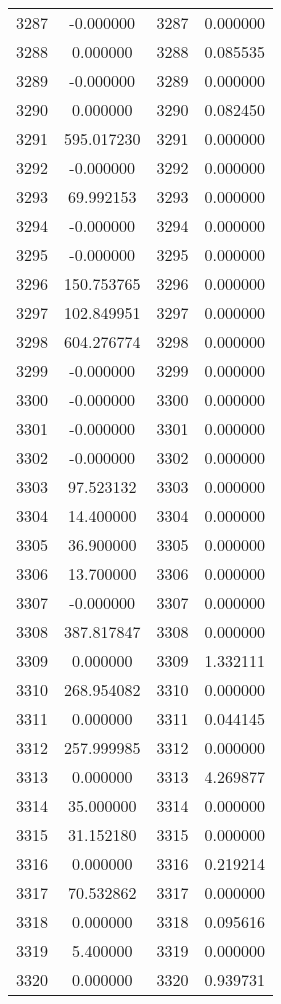 \documentclass[12pt]{article}
\begin{document}
\begin{longtable}{@{}cccc@{}}
3287 & -0.000000 & 3287 & 0.000000 \\
3288 & 0.000000 & 3288 & 0.085535 \\
3289 & -0.000000 & 3289 & 0.000000 \\
3290 & 0.000000 & 3290 & 0.082450 \\
3291 & 595.017230 & 3291 & 0.000000 \\
3292 & -0.000000 & 3292 & 0.000000 \\
3293 & 69.992153 & 3293 & 0.000000 \\
3294 & -0.000000 & 3294 & 0.000000 \\
3295 & -0.000000 & 3295 & 0.000000 \\
3296 & 150.753765 & 3296 & 0.000000 \\
3297 & 102.849951 & 3297 & 0.000000 \\
3298 & 604.276774 & 3298 & 0.000000 \\
3299 & -0.000000 & 3299 & 0.000000 \\
3300 & -0.000000 & 3300 & 0.000000 \\
3301 & -0.000000 & 3301 & 0.000000 \\
3302 & -0.000000 & 3302 & 0.000000 \\
3303 & 97.523132 & 3303 & 0.000000 \\
3304 & 14.400000 & 3304 & 0.000000 \\
3305 & 36.900000 & 3305 & 0.000000 \\
3306 & 13.700000 & 3306 & 0.000000 \\
3307 & -0.000000 & 3307 & 0.000000 \\
3308 & 387.817847 & 3308 & 0.000000 \\
3309 & 0.000000 & 3309 & 1.332111 \\
3310 & 268.954082 & 3310 & 0.000000 \\
3311 & 0.000000 & 3311 & 0.044145 \\
3312 & 257.999985 & 3312 & 0.000000 \\
3313 & 0.000000 & 3313 & 4.269877 \\
3314 & 35.000000 & 3314 & 0.000000 \\
3315 & 31.152180 & 3315 & 0.000000 \\
3316 & 0.000000 & 3316 & 0.219214 \\
3317 & 70.532862 & 3317 & 0.000000 \\
3318 & 0.000000 & 3318 & 0.095616 \\
3319 & 5.400000 & 3319 & 0.000000 \\
3320 & 0.000000 & 3320 & 0.939731 \\

\end{longtable}
\end{document}
